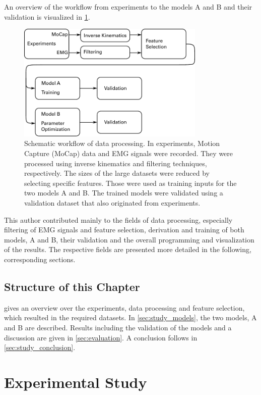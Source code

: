 An overview of the workflow from experiments to the models A and B and their validation is visualized in \cref{fig:schematitc}.
\begin{figure}%
  \centering%
  \includegraphics[width=0.8\textwidth]{images/summer_school_study/schematitc.pdf}%
  \caption{Schematic workflow of data processing. In experiments, Motion Capture (MoCap) data and EMG signals were recorded. They were processed using inverse kinematics and filtering techniques, respectively. The sizes of the large datasets were reduced by selecting specific features. Those were used as training inputs for the two models A and B. The trained models were validated using a validation dataset that also originated from experiments.}%
  \label{fig:schematitc}%
\end{figure}%
%
This author contributed mainly to the fields of data processing, especially filtering of EMG signals and feature selection, derivation and training of both models, A and B, their validation and the overall programming and visualization of the results. The respective fields are presented more detailed in the following, corresponding sections.

\subsection{Structure of this Chapter}
 gives an overview over the experiments, data processing and feature selection, which resulted in the required datasets. In \cref{sec:study_models}, the two models, A and B are described. Results including the validation of the models and a discussion are given in \cref{sec:evaluation}. A conclusion follows in \cref{sec:study_conclusion}.

\section{Experimental Study}\label{sec:exp_study}


